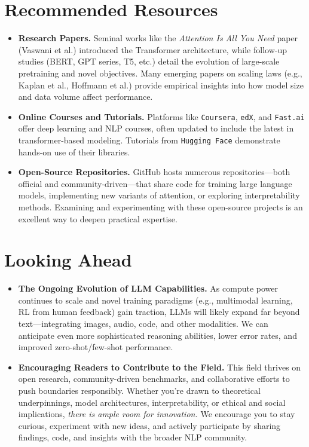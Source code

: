 \section{Recommended Resources}
\label{sec:recommended_resources}
\begin{itemize}
    \item \textbf{Research Papers.} Seminal works like the \emph{Attention Is All You Need} paper (Vaswani et al.) introduced the Transformer architecture, while follow-up studies (BERT, GPT series, T5, etc.) detail the evolution of large-scale pretraining and novel objectives. Many emerging papers on scaling laws (e.g., Kaplan et al., Hoffmann et al.) provide empirical insights into how model size and data volume affect performance.
    \item \textbf{Online Courses and Tutorials.} Platforms like \texttt{Coursera}, \texttt{edX}, and \texttt{Fast.ai} offer deep learning and NLP courses, often updated to include the latest in transformer-based modeling. Tutorials from \texttt{Hugging Face} demonstrate hands-on use of their libraries.
    \item \textbf{Open-Source Repositories.} GitHub hosts numerous repositories—both official and community-driven—that share code for training large language models, implementing new variants of attention, or exploring interpretability methods. Examining and experimenting with these open-source projects is an excellent way to deepen practical expertise.
\end{itemize}

\section{Looking Ahead}
\label{sec:looking_ahead}
\begin{itemize}
    \item \textbf{The Ongoing Evolution of LLM Capabilities.} 
    As compute power continues to scale and novel training paradigms (e.g., multimodal learning, RL from human feedback) gain traction, LLMs will likely expand far beyond text—integrating images, audio, code, and other modalities. We can anticipate even more sophisticated reasoning abilities, lower error rates, and improved zero-shot/few-shot performance.
    \item \textbf{Encouraging Readers to Contribute to the Field.} 
    This field thrives on open research, community-driven benchmarks, and collaborative efforts to push boundaries responsibly. Whether you’re drawn to theoretical underpinnings, model architectures, interpretability, or ethical and social implications, \emph{there is ample room for innovation.} We encourage you to stay curious, experiment with new ideas, and actively participate by sharing findings, code, and insights with the broader NLP community.
\end{itemize}

